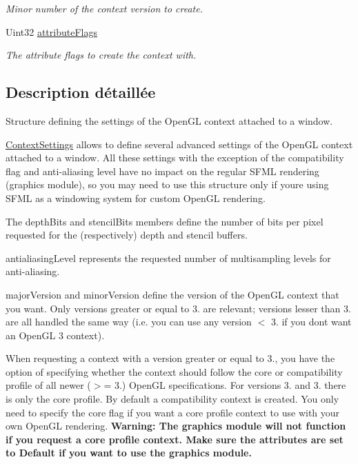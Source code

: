 \begin{DoxyCompactItemize}
\begin{DoxyCompactList}\small\item\em Minor number of the context version to create. \end{DoxyCompactList}\item 
\mbox{\label{structsf_1_1ContextSettings_a0ef3fc53802bc0197d2739466915ada5}} 
Uint32 \hyperlink{structsf_1_1ContextSettings_a0ef3fc53802bc0197d2739466915ada5}{attribute\+Flags}
\begin{DoxyCompactList}\small\item\em The attribute flags to create the context with. \end{DoxyCompactList}\end{DoxyCompactItemize}


\subsection{Description détaillée}
Structure defining the settings of the Open\+GL context attached to a window. 

\hyperlink{structsf_1_1ContextSettings}{Context\+Settings} allows to define several advanced settings of the Open\+GL context attached to a window. All these settings with the exception of the compatibility flag and anti-\/aliasing level have no impact on the regular S\+F\+ML rendering (graphics module), so you may need to use this structure only if you\textquotesingle{}re using S\+F\+ML as a windowing system for custom Open\+GL rendering.

The depth\+Bits and stencil\+Bits members define the number of bits per pixel requested for the (respectively) depth and stencil buffers.

antialiasing\+Level represents the requested number of multisampling levels for anti-\/aliasing.

major\+Version and minor\+Version define the version of the Open\+GL context that you want. Only versions greater or equal to 3. are relevant; versions lesser than 3. are all handled the same way (i.\+e. you can use any version $<$ 3. if you don\textquotesingle{}t want an Open\+GL 3 context).

When requesting a context with a version greater or equal to 3., you have the option of specifying whether the context should follow the core or compatibility profile of all newer ($>$= 3.) Open\+GL specifications. For versions 3. and 3. there is only the core profile. By default a compatibility context is created. You only need to specify the core flag if you want a core profile context to use with your own Open\+GL rendering. {\bfseries Warning\+: The graphics module will not function if you request a core profile context. Make sure the attributes are set to Default if you want to use the graphics module.}


